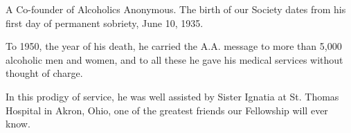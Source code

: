 
\bbChapterPreamble


\begin{biblechapter}
    A Co-founder of Alcoholics Anonymous.
\verse The birth of our Society 
    dates from his first day of permanent sobriety, 
    June 10, 1935.

\verse To 1950, the year of his death, 
    he carried the A.A. message  
    to  more  than  5,000  alcoholic  men  and women, 
    and to all these he gave his medical services
    without thought of charge.

\verse In this prodigy of service, 
    he was well assisted by Sister Ignatia 
    at St. Thomas Hospital in Akron, Ohio,
    one of the greatest friends our Fellowship will ever know.
\end{biblechapter}


